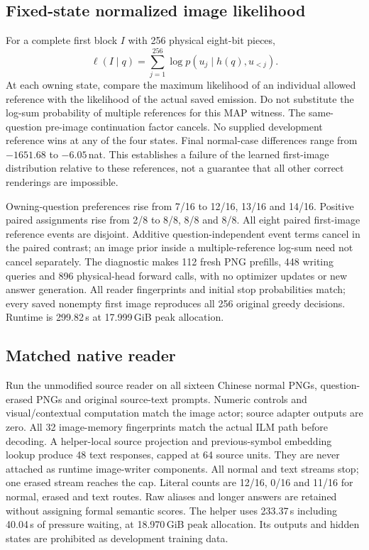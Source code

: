 \documentclass[10pt,a4paper]{article}
\begin{document}
\subsection*{Fixed-state normalized image likelihood}
For a complete first block $I$ with 256 physical eight-bit pieces,
\[
\ell(I\mid q)=\sum_{j=1}^{256}\log p(u_j\mid h(q),u_{<j}).
\]
At each owning state, compare the maximum likelihood of an individual allowed
reference with the likelihood of the actual saved emission. Do not substitute
the log-sum probability of multiple references for this MAP witness. The
same-question pre-image continuation factor cancels. No supplied development
reference wins at any of the four states. Final normal-case differences
range from $-1651.68$ to $-6.05$\,nat. This establishes a failure of the learned
first-image distribution relative to these references, not a guarantee that
all other correct renderings are impossible.

Owning-question preferences rise from 7/16 to 12/16, 13/16 and 14/16.
Positive paired assignments rise from 2/8 to 8/8, 8/8 and 8/8. All eight
paired first-image reference events are disjoint. Additive question-independent
event terms cancel in the paired contrast; an image prior inside a
multiple-reference log-sum need not cancel separately. The diagnostic makes
112 fresh PNG prefills, 448 writing queries and 896 physical-head forward
calls, with no optimizer updates or new answer generation. All reader
fingerprints and initial stop probabilities match; every saved nonempty
first image reproduces all 256 original greedy decisions. Runtime is
299.82\,s at 17.999\,GiB peak allocation.

\subsection*{Matched native reader}
Run the unmodified source reader on all sixteen Chinese normal PNGs,
question-erased PNGs and original source-text prompts. Numeric controls and
visual/contextual computation match the image actor; source adapter outputs
are zero. All 32 image-memory fingerprints match the actual ILM path before
decoding. A helper-local source projection and previous-symbol embedding
lookup produce 48 text responses, capped at 64 source units. They are never
attached as runtime image-writer components. All normal and text streams
stop; one erased stream reaches the cap. Literal counts are 12/16, 0/16 and
11/16 for normal, erased and text routes. Raw aliases and longer answers
are retained without assigning formal semantic scores. The helper uses
233.37\,s including 40.04\,s of pressure waiting, at 18.970\,GiB peak allocation.
Its outputs and hidden states are prohibited as development training data.
\end{document}
